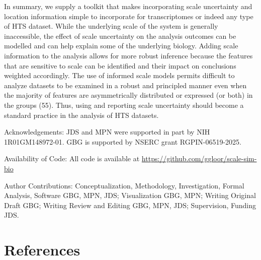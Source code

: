 \documentclass[
]{article}
\begin{document}
In summary, we supply a toolkit that makes incorporating scale
uncertainty and location information simple to incorporate for
transcriptomes or indeed any type of HTS dataset. While the underlying
scale of the system is generally inaccessible, the effect of scale
uncertainty on the analysis outcomes can be modelled and can help
explain some of the underlying biology. Adding scale information to the
analysis allows for more robust inference because the features that are
sensitive to scale can be identified and their impact on conclusions
weighted accordingly. The use of informed scale models permits difficult
to analyze datasets to be examined in a robust and principled manner
even when the majority of features are asymmetrically distributed or
expressed (or both) in the groups (55). Thus, using and reporting scale
uncertainty should become a standard practice in the analysis of HTS
datasets.

Acknowledgements: JDS and MPN were supported in part by NIH
1R01GM148972-01. GBG is supported by NSERC grant RGPIN-06519-2025.

Availability of Code: All code is available at
\url{https://github.com/ggloor/scale-sim-bio}

Author Contributions: Conceptualization, Methodology, Investigation,
Formal Analysis, Software GBG, MPN, JDS; Visualization GBG, MPN; Writing
Original Draft GBG; Writing Review and Editing GBG, MPN, JDS;
Supervision, Funding JDS. \singlespacing

\section*{References}\label{references}
\end{document}
